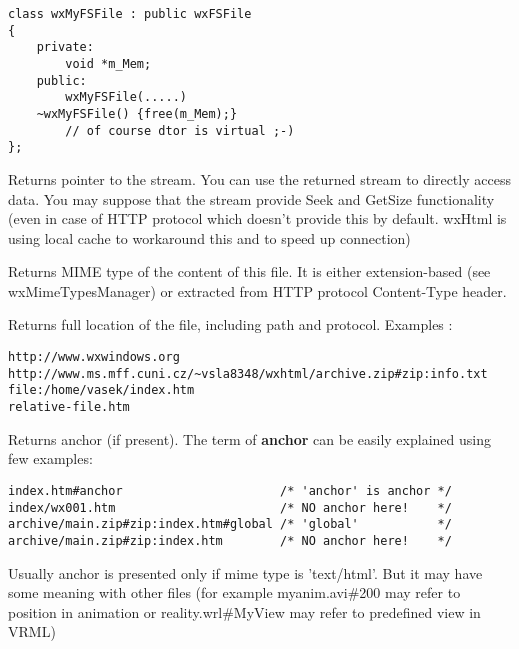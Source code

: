 \begin{verbatim}
class wxMyFSFile : public wxFSFile
{
    private:
        void *m_Mem;
    public:
        wxMyFSFile(.....)
	~wxMyFSFile() {free(m_Mem);}
	    // of course dtor is virtual ;-)
};
\end{verbatim}

\label{wxfsfilegetstream}


Returns pointer to the stream. You can use the returned
stream to directly access data. You may suppose
that the stream provide Seek and GetSize functionality
(even in case of HTTP protocol which doesn't provide
this by default. wxHtml is using local cache to workaround
this and to speed up connection)

\label{wxfsfilegetmimetype}


Returns MIME type of the content of this file. It is either
extension-based (see wxMimeTypesManager) or extracted from
HTTP protocol Content-Type header.

\label{wxfsfilegetlocation}


Returns full location of the file, including path and protocol. 
Examples : 

\begin{verbatim}
http://www.wxwindows.org
http://www.ms.mff.cuni.cz/~vsla8348/wxhtml/archive.zip#zip:info.txt
file:/home/vasek/index.htm
relative-file.htm
\end{verbatim}

\label{wxfsfilegetanchor}


Returns anchor (if present). The term of {\bf anchor} can be easily
explained using few examples:

\begin{verbatim}
index.htm#anchor                      /* 'anchor' is anchor */
index/wx001.htm                       /* NO anchor here!    */
archive/main.zip#zip:index.htm#global /* 'global'           */
archive/main.zip#zip:index.htm        /* NO anchor here!    */
\end{verbatim}

Usually anchor is presented only if mime type is 'text/html'.
But it may have some meaning with other files
(for example myanim.avi\#200 may refer to position in animation
or reality.wrl\#MyView may refer to predefined view in VRML)

